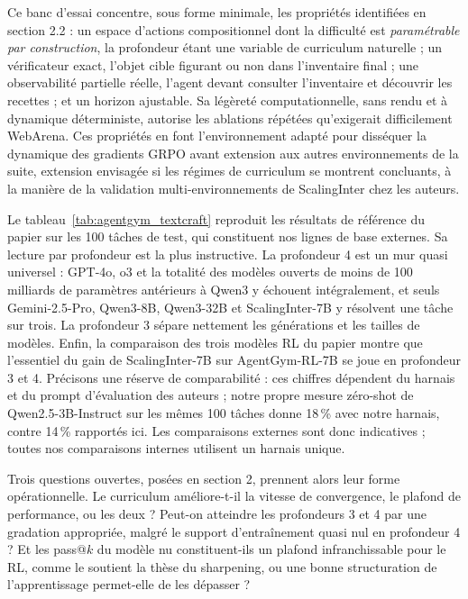 \documentclass[11pt,a4paper]{article}
\begin{document}
Ce banc d'essai concentre, sous forme minimale, les propriétés identifiées en section 2.2 : un espace d'actions compositionnel dont la difficulté est \emph{paramétrable par construction}, la profondeur étant une variable de curriculum naturelle ; un vérificateur exact, l'objet cible figurant ou non dans l'inventaire final ; une observabilité partielle réelle, l'agent devant consulter l'inventaire et découvrir les recettes ; et un horizon ajustable. Sa légèreté computationnelle, sans rendu et à dynamique déterministe, autorise les ablations répétées qu'exigerait difficilement WebArena. Ces propriétés en font l'environnement adapté pour disséquer la dynamique des gradients GRPO avant extension aux autres environnements de la suite, extension envisagée si les régimes de curriculum se montrent concluants, à la manière de la validation multi-environnements de ScalingInter chez les auteurs.

Le tableau~\ref{tab:agentgym_textcraft} reproduit les résultats de référence du papier sur les 100 tâches de test, qui constituent nos lignes de base externes. Sa lecture par profondeur est la plus instructive. La profondeur 4 est un mur quasi universel : GPT-4o, o3 et la totalité des modèles ouverts de moins de 100 milliards de paramètres antérieurs à Qwen3 y échouent intégralement, et seuls Gemini-2.5-Pro, Qwen3-8B, Qwen3-32B et ScalingInter-7B y résolvent une tâche sur trois. La profondeur 3 sépare nettement les générations et les tailles de modèles. Enfin, la comparaison des trois modèles RL du papier montre que l'essentiel du gain de ScalingInter-7B sur AgentGym-RL-7B se joue en profondeur 3 et 4. Précisons une réserve de comparabilité : ces chiffres dépendent du harnais et du prompt d'évaluation des auteurs ; notre propre mesure zéro-shot de Qwen2.5-3B-Instruct sur les mêmes 100 tâches donne 18\,\% avec notre harnais, contre 14\,\% rapportés ici. Les comparaisons externes sont donc indicatives ; toutes nos comparaisons internes utilisent un harnais unique.

Trois questions ouvertes, posées en section 2, prennent alors leur forme opérationnelle. Le curriculum améliore-t-il la vitesse de convergence, le plafond de performance, ou les deux ? Peut-on atteindre les profondeurs 3 et 4 par une gradation appropriée, malgré le support d'entraînement quasi nul en profondeur 4 ? Et les pass@$k$ du modèle nu constituent-ils un plafond infranchissable pour le RL, comme le soutient la thèse du sharpening, ou une bonne structuration de l'apprentissage permet-elle de les dépasser ?
\end{document}
